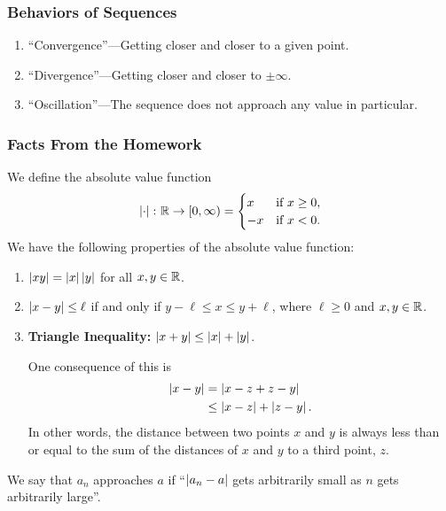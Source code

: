 \documentclass[class=article, crop=false]{standalone}
\begin{document}
  \subsubsection{Behaviors of Sequences}
  \begin{enumerate}[label=(\alph*)]
    \item ``Convergence''---Getting closer and closer to a given point.
    \item ``Divergence''---Getting closer and closer to $\pm\infty$.
    \item ``Oscillation''---The sequence does not approach any value in particular.
  \end{enumerate}
  \subsubsection{Facts From the Homework}
  We define the absolute value function
  \[
    \left\lvert \cdot \right\rvert\colon \mathbb{R}\to[0, \infty) = \begin{cases}
      x & \text{if }x\geq 0, \\
      -x & \text{if }x < 0.
    \end{cases}
  \]
  We have the following properties of the absolute value function:
  \begin{enumerate}[label=(\roman*)]
    \item $\left\lvert xy \right\rvert = \left\lvert x \right\rvert\left\lvert y \right\rvert$ for all $x,y\in\mathbb{R}$.
    \item $\left\lvert x - y \right\rvert\leq \ell$ if and only if $y - \ell\leq x\leq y + \ell$, where $\ell\geq 0$ and $x, y\in\mathbb{R}$.
    \item \textbf{Triangle Inequality:} $\left\lvert x + y \right\rvert\leq \left\lvert x \right\rvert + \left\lvert y \right\rvert$.
    \begin{note}{}
      One consequence of this is
      \begin{align*}
        \left\lvert x - y \right\rvert &= \left\lvert x - z + z - y \right\rvert \\
                    &\leq \left\lvert x - z \right\rvert + \left\lvert z - y \right\rvert.
      \end{align*}
      In other words, the distance between two points $x$ and $y$ is always less than or equal to the sum of the distances of $x$ and $y$ to a third point, $z$.
    \end{note}
  \end{enumerate}
  We say that $a_n$ approaches $a$ if ``$\left\lvert a_n - a \right\rvert$ gets arbitrarily small as $n$ gets arbitrarily large''.
\end{document}
